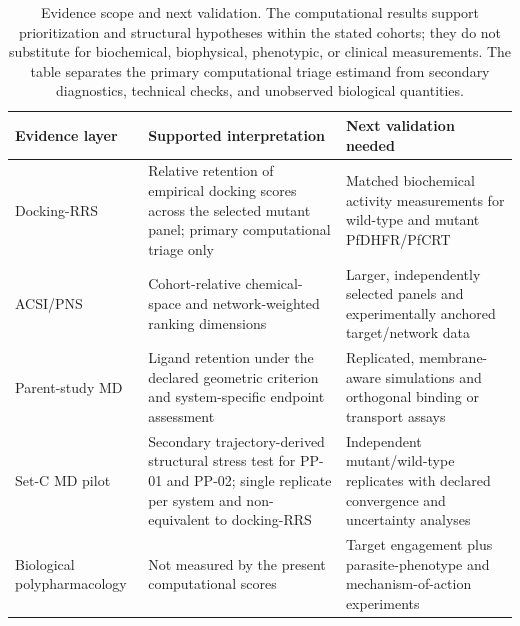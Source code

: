 \begin{table}[htbp]
\centering
\scriptsize
\caption{Evidence scope and next validation. The computational results support prioritization and structural hypotheses within the stated cohorts; they do not substitute for biochemical, biophysical, phenotypic, or clinical measurements. The table separates the primary computational triage estimand from secondary diagnostics, technical checks, and unobserved biological quantities.}
\label{tab:s13_evidence_scope}
\begin{tabularx}{\textwidth}{>{\raggedright\arraybackslash}p{} >{\raggedright\arraybackslash}p{} >{\raggedright\arraybackslash}X}
\toprule
Evidence layer & Supported interpretation & Next validation needed \\
\midrule
Docking-RRS & Relative retention of empirical docking scores across the selected mutant panel; primary computational triage only & Matched biochemical activity measurements for wild-type and mutant PfDHFR/PfCRT \\
ACSI/PNS & Cohort-relative chemical-space and network-weighted ranking dimensions & Larger, independently selected panels and experimentally anchored target/network data \\
Parent-study MD & Ligand retention under the declared geometric criterion and system-specific endpoint assessment & Replicated, membrane-aware simulations and orthogonal binding or transport assays \\
Set-C MD pilot & Secondary trajectory-derived structural stress test for PP-01 and PP-02; single replicate per system and non-equivalent to docking-RRS & Independent mutant/wild-type replicates with declared convergence and uncertainty analyses \\
Biological polypharmacology & Not measured by the present computational scores & Target engagement plus parasite-phenotype and mechanism-of-action experiments \\
\bottomrule
\end{tabularx}
\end{table}
